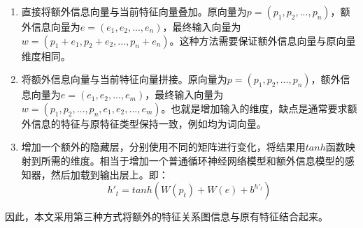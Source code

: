 \begin{enumerate}
  \item 直接将额外信息向量与当前特征向量叠加。原向量为$p=(p_1,p_2,...,p_n)$，额外信息向量为$e=(e_1,e_2,...,e_n)$，最终输入向量为$w=(p_1+e_1,p_2+e_2,...,p_n+e_n)$。这种方法需要保证额外信息向量与原向量维度相同。
  \item 将额外信息向量与当前特征向量拼接。原向量为$p=(p_1,p_2,...,p_n)$，额外信息向量为$e=(e_1,e_2,...,e_m)$，最终输入向量为$w=(p_1,p_2,...,p_n,e_1,e_2,...,e_m)$。也就是增加输入的维度，缺点是通常要求额外信息的特征与原特征类型保持一致，例如均为词向量。
  \item 增加一个额外的隐藏层，分别使用不同的矩阵进行变化，将结果用$tanh$函数映射到所需的维度。相当于增加一个普通循环神经网络模型和额外信息模型的感知器，然后加载到输出层上。即：
  \begin{equation}
    h'_t= tanh(W(p_t) + W(e) + b^{h'_t})
  \end{equation}
\end{enumerate}
因此，本文采用第三种方式将额外的特征关系图信息与原有特征结合起来。


